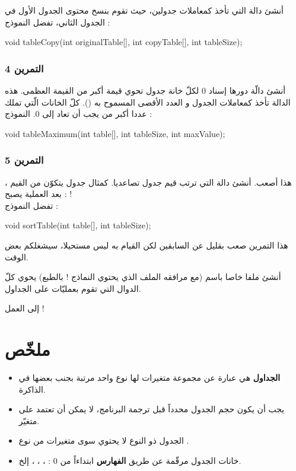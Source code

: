 أنشئ دالة
التي تأخذ كمعاملات جدولين، حيث تقوم بنسخ محتوى الجدول الأول في الجدول الثاني، تفضل النموذج :

\begin{Csource}
void tableCopy(int originalTable[], int copyTable[], int tableSize);
\end{Csource}

\subsubsection{التمرين 4}

أنشئ دالّة
دورها إسناد 0 لكلّ خانة جدول تحوي قيمة أكبر من القيمة العظمى. هذه الدالة تأخذ كمعاملات الجدول و العدد الأقصى المسموح به
().
كلّ الخانات الّتي تملك عددا أكبر من
يجب أن تعاد إلى 0. النموذج :

\begin{Csource}
void tableMaximum(int table[], int tableSize, int maxValue);
\end{Csource}

\subsubsection{التمرين 5}

هذا أصعب. أنشئ دالة
التي ترتب قيم جدول تصاعديا. كمثال جدول يتكوّن من القيم
،
بعد العملية يصبح :
 !\\
تفضل النموذج :

\begin{Csource}
void sortTable(int table[], int tableSize);
\end{Csource}

هذا التمرين صعب بقليل عن السابقين لكن القيام به ليس مستحيلا، سيشغلكم بعض الوقت.

\begin{information}
أنشئ ملفا خاصا باسم
(مع مرافقه الملف
الذي يحتوي النماذج ! بالطبع) يحوي كلّ الدوال التي تقوم بعمليّات على الجداول.
\end{information}

إلى العمل !

\section*{ملخّص}

\begin{itemize}
  \item \textbf{الجداول}
هي عبارة عن مجموعة متغيرات لها نوع واحد مرتبة بجنب بعضها في الذاكرة.
  \item يجب أن يكون حجم الجدول محدداً قبل ترجمة البرنامج، لا يمكن أن تعتمد على متغيّر.
  \item الجدول ذو النوع
لا يحتوي سوى متغيرات من نوع
.
  \item خانات الجدول مرقّمة عن طريق
\textbf{الفهارس}
ابتداءاً من 0 :
، ، ،
إلخ.
\end{itemize}
